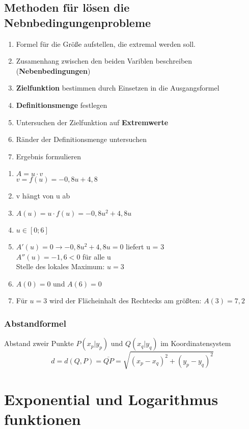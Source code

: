 \documentclass{scrbook}
\begin{document}
\section{Methoden für lösen die Nebnbedingungenprobleme}
\begin{multicols}{2}

\begin{enumerate}
\item Formel für die Größe aufstellen, die extremal werden soll.
\item Zusamenhang zwischen den beiden Variblen beschreiben (\textbf{Nebenbedingungen})
\item \textbf{Zielfunktion} bestimmen durch Einsetzen in die Ausgangsformel
\item \textbf{Definitionsmenge} festlegen
\item Untersuchen der Zielfunktion auf \textbf{Extremwerte}
\item Ränder der Definitionsmenge untersuchen
\item Ergebnis formulieren
\end{enumerate}

\columnbreak
\begin{enumerate}
\item $A= u \cdot v$
\\
$v = f(u) = -0,8u + 4,8$
\item v hängt von u ab
\item $A(u) = u \cdot f(u) = -0,8u^2 + 4,8u$
\item $u \in [0;6]$
\item $A'(u) = 0 \rightarrow -0,8u^2 + 4,8u = 0$ liefert u = 3
\\
$A''(u) = -1,6 < 0$ für alle u
\\
Stelle des lokales Maximum: $u = 3$
\item $A(0) = 0$ und $A(6) = 0$
\item Für $u = 3$ wird der Flächeinhalt des Rechtecks am größten: $A(3) = 7,2$
\end{enumerate}

\end{multicols}

\subsection{Abstandformel}
Abstand zweir Punkte $P(x_p\vert y_p)$ und $Q(x_q\vert y_q)$ im Koordinatensystem
\[d = d(Q, P) = \overline{QP} = \sqrt{(x_p - x_q)^2 + (y_p - y_q)^2}\]
\chapter{Exponential und Logarithmus funktionen}
\end{document}
